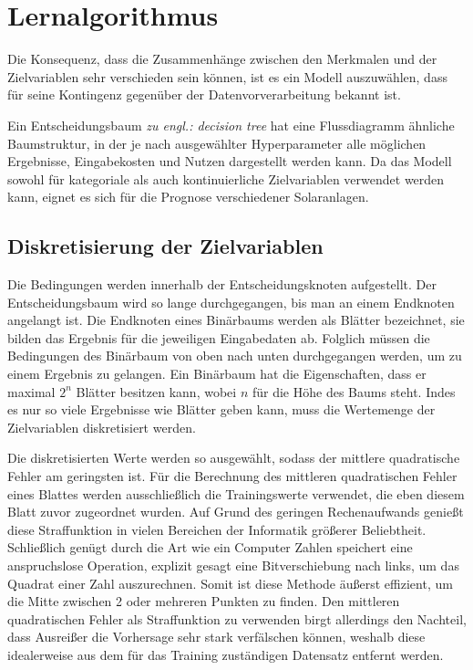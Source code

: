 \documentclass[12pt, a4paper]{article}
\begin{document}
\newpage

\section{Lernalgorithmus}

Die Konsequenz, dass die Zusammenhänge zwischen den Merkmalen und der Zielvariablen sehr verschieden sein können, ist es ein Modell auszuwählen, dass für seine Kontingenz gegenüber der Datenvorverarbeitung bekannt ist. 

Ein Entscheidungsbaum \textit{zu engl.: decision tree} hat eine Flussdiagramm ähnliche Baumstruktur, in der je nach ausgewählter Hyperparameter alle möglichen Ergebnisse, Eingabekosten und Nutzen dargestellt werden kann. Da das Modell sowohl für kategoriale als auch kontinuierliche Zielvariablen verwendet werden kann, eignet es sich für die Prognose verschiedener Solaranlagen. 

\subsection{Diskretisierung der Zielvariablen}

Die Bedingungen werden innerhalb der Entscheidungsknoten aufgestellt. Der Entscheidungsbaum wird so lange durchgegangen, bis man an einem Endknoten angelangt ist. Die Endknoten eines Binärbaums werden als Blätter bezeichnet, sie bilden das Ergebnis für die jeweiligen Eingabedaten ab. Folglich müssen die Bedingungen des Binärbaum von oben nach unten durchgegangen werden, um zu einem Ergebnis zu gelangen. Ein Binärbaum hat die Eigenschaften, dass er maximal $2^{n}$ Blätter besitzen kann, wobei $n$ für die Höhe des Baums steht. Indes es nur so viele Ergebnisse wie Blätter geben kann, muss die Wertemenge der Zielvariablen diskretisiert werden. 

Die diskretisierten Werte werden so ausgewählt, sodass der mittlere quadratische Fehler am geringsten ist. Für die Berechnung des mittleren quadratischen Fehler eines Blattes werden ausschließlich die Trainingswerte verwendet, die eben diesem Blatt zuvor zugeordnet wurden. Auf Grund des geringen Rechenaufwands genießt diese Straffunktion in vielen Bereichen der Informatik größerer Beliebtheit. Schließlich genügt durch die Art wie ein Computer Zahlen speichert eine anspruchslose Operation, explizit gesagt eine Bitverschiebung nach links, um das Quadrat einer Zahl auszurechnen. Somit ist diese Methode äußerst effizient, um die Mitte zwischen 2 oder mehreren Punkten zu finden. Den mittleren quadratischen Fehler als Straffunktion zu verwenden birgt allerdings den Nachteil, dass Ausreißer die Vorhersage sehr stark verfälschen können, weshalb diese idealerweise aus dem für das Training zuständigen Datensatz entfernt werden.
\end{document}
